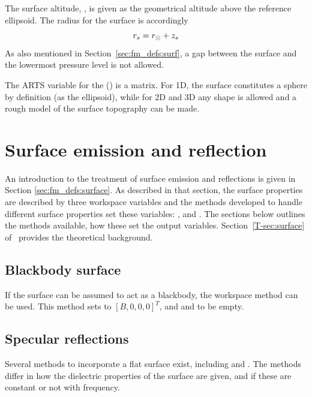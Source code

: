 The surface altitude, , is given as the geometrical altitude above the
reference ellipsoid. The radius for the surface is accordingly
\begin{equation}
  r_{s} = r_{\odot} + z_{s}
 \label{eq:fm_defs:zsurface}
\end{equation}
As also mentioned in Section~\ref{sec:fm_defs:surf}, a gap between the surface
and the lowermost pressure level is not allowed.

The ARTS variable for the  ()
is a matrix. For 1D, the surface constitutes a sphere by definition (as the
ellipsoid), while for 2D and 3D any shape is allowed and a rough model of the
surface topography can be made.




\section{Surface emission and reflection}
\label{sec:surf:eandr}

An introduction to the treatment of surface emission and reflections is given
in Section \ref{sec:fm_defs:surface}. As described in that section, the surface
properties are described by three workspace variables and the methods developed
to handle different surface properties set these variables:
,  and
. The sections below outlines the methods available,
how these set the output variables.
Section~\ref{T-sec:surface} of \theory\ provides the theoretical
background.



\subsection{Blackbody surface}
%
If the surface can be assumed to act as a blackbody, the workspace method
 can be used. This method sets
 to $[B,0,0,0]^T$, and 
and  to be empty.




\subsection{Specular reflections}
%
Several methods to incorporate a flat surface exist, including
 and
. The methods differ in how the dielectric
properties of the surface are given, and if these are constant or not with
frequency.

